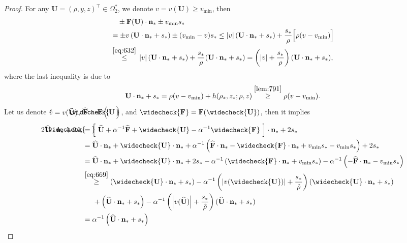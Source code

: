 \documentclass[times,final]{elsarticle}
\numberwithin{equation}{section}
\theoremstyle{definition}
\theoremstyle{remark}
\newcommand{\BU}{\mathbf{U}}
\newcommand{\hBU}{\widehat{\BU}}
\newcommand{\cBU}{\widecheck{\BU}}
\newcommand{\BF}{\mathbf{F}}
\newcommand{\hBF}{\widehat{\BF}}
\newcommand{\cBF}{\widecheck{\BF}}
\newcommand{\Bn}{\mathbf{n}}
\newcommand{\hcBU}{
	\mathrlap{
		\raisebox{0.6 pt}{$\widecheck{\phantom{\mathbf{U}}}$}
	}
	\mathrlap{
		\raisebox{-0.6 pt}{$\widehat{\phantom{\mathbf{U}}}$}
	}
	\mathbf{U}
}
\newcommand{\hcv}{
	\mathrlap{
		\raisebox{0.5 pt}{$\check{\phantom{v}}$}
	}
	\mathrlap{
		\raisebox{-0.5 pt}{$\hat{\phantom{v}}$}
	}
	v
}
\begin{document}
\begin{proof}
	For any $\BU = (\rho,y,z)^\top \in \Omega_2^*$, we denote $v = v(\BU) \ge v_{\min}$, then
	\begin{equation}\label{eq:669}
		\begin{aligned}
			& ~~~ \pm \BF(\BU) \cdot \Bn_*
			\pm v_{\min} s_*
			\\
			& = 
			\pm v \, (\BU \cdot \Bn_* + s_*)
			\pm (v_{\min}-v) s_*
			\le 
			|v|\,(\BU \cdot \Bn_* + s_*)
			+\frac{s_*}{\rho}\Big[ \rho (v-v_{\min}) \Big]
			\\
			& \stackrel{\eqref{eq:632}}{\le} 
			\, |v|\,(\BU \cdot \Bn_* + s_*)
			+
			\frac{s_*}{\rho}(\BU \cdot \Bn_* + s_*)
			=
			\left( |v|+\frac{s_*}{\rho} \right)
			(\BU \cdot \Bn_* + s_*)
			,
		\end{aligned}
	\end{equation}
	where the last inequality is due to
	\begin{equation}\label{eq:2966}
		\BU \cdot \Bn_* + s_*
		=
		\rho (v-v_{\min}) + h(\rho_*,z_*;\rho,z)
		\stackrel{\rm \Cref{lem:791}}{\ge}
		\rho (v-v_{\min}).
	\end{equation}
	Let us denote $\hcv = v(\hcBU)$, $\hBF = \BF(\hBU)$, and $\cBF = \BF(\cBU)$, then it implies
	\begin{equation}\label{eq:726}
		\begin{aligned}
			2\hcBU \cdot \Bn_* + 2s_*
			& =
			\left[~
			\hBU + \alpha^{-1} \hBF + \cBU - \alpha^{-1} \cBF 
			~\right] 
			\cdot \Bn_* + 2 s_*
			\\
			& =  
			\hBU \cdot \Bn_* + \cBU \cdot \Bn_*
			+
			\alpha^{-1}
			\left(
			\hBF \cdot \Bn_*
			-
			\cBF \cdot \Bn_*
			+
			v_{\min} s_*
			-
			v_{\min} s_*
			\right)
			+
			2 s_*
			\\
			& =  
			\hBU \cdot \Bn_* + \cBU \cdot \Bn_*	+ 2s_*
			-
			\alpha^{-1} \left( \cBF \cdot \Bn_* + v_{\min} s_* \right)
			-
			\alpha^{-1} \left(-\hBF \cdot \Bn_*	- v_{\min} s_*	 \right)
			\\
			& \stackrel{\eqref{eq:669}}{\ge}  
			\left(\cBU \cdot \Bn_*+s_*\right)
			-
			\alpha^{-1}
			\left( \left|v(\cBU)\right|+\frac{s_*}{\hat{\rho}}\right)
			(\cBU \cdot \Bn_* + s_*)
			\\
			&
			\hspace{5mm} +
			\left(\hBU \cdot \Bn_*+s_*\right)
			-
			\alpha^{-1}
			\left( \left|v(\hBU)\right|+\frac{s_*}{\hat{\rho}}\right)
			(\hBU \cdot \Bn_* + s_*)
			\\
			& = 
			\alpha^{-1}
			\left(\hBU \cdot \Bn_*+s_*\right)

\end{aligned}
\end{equation}
\end{proof}
\end{document}
